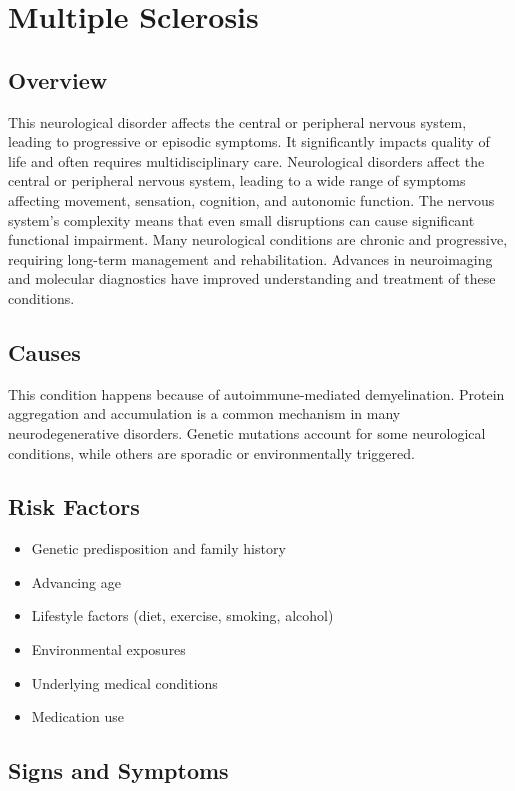 \chapter{Multiple Sclerosis}
\label{sec:Multiple Sclerosis}

\section{Overview}
This neurological disorder affects the central or peripheral nervous system, leading to progressive or episodic symptoms. It significantly impacts quality of life and often requires multidisciplinary care. Neurological disorders affect the central or peripheral nervous system, leading to a wide range of symptoms affecting movement, sensation, cognition, and autonomic function. The nervous system's complexity means that even small disruptions can cause significant functional impairment. Many neurological conditions are chronic and progressive, requiring long-term management and rehabilitation. Advances in neuroimaging and molecular diagnostics have improved understanding and treatment of these conditions.
\section{Causes}
This condition happens because of autoimmune-mediated demyelination.    Protein aggregation and accumulation is a common mechanism in many neurodegenerative disorders.  Genetic mutations account for some neurological conditions, while others are sporadic or environmentally triggered.   
\section{Risk Factors}
\begin{itemize}[noitemsep]
  \item Genetic predisposition and family history
  \item Advancing age
  \item Lifestyle factors (diet, exercise, smoking, alcohol)
  \item Environmental exposures
  \item Underlying medical conditions
  \item Medication use
\end{itemize}
\section{Signs and Symptoms}
